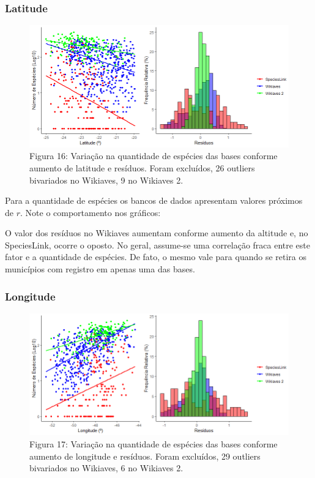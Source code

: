 \documentclass[12pt]{extarticle}
\newenvironment{resposta}{ \color{mygray}}{}
\begin{document}
\subsubsection{Latitude}

 

\begin{figure}[h!]
\centering
\includegraphics[width = 15cm]{Imagens/G09.png}
\\{\scriptsize Figura 16: Variação na quantidade de espécies das bases conforme aumento de latitude e resíduos. Foram excluídos, 26 outliers bivariados no Wikiaves, 9 no Wikiaves 2.}
\end{figure}

\begin{resposta}
Para a quantidade de espécies os bancos de dados apresentam valores próximos de $r$. Note o comportamento nos gráficos:

O valor dos resíduos no Wikiaves aumentam conforme aumento da altitude e, no SpeciesLink, ocorre o oposto. No geral, assume-se uma correlação fraca entre este fator e a quantidade de espécies. De fato, o mesmo vale para quando se retira os municípios com registro em apenas uma das bases.
\end{resposta}

\subsubsection{Longitude}

\begin{figure}[h!]
\centering
\includegraphics[width = 15cm]{Imagens/G10.png}
\\{\scriptsize Figura 17: Variação na quantidade de espécies das bases conforme aumento de longitude e resíduos. Foram excluídos, 29 outliers bivariados no Wikiaves, 6 no Wikiaves 2.}
\end{figure}
\end{document}
